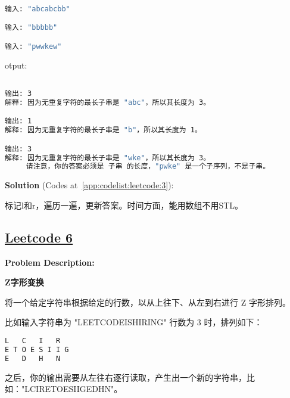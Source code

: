 \begin{lstlisting}[language=bash]

输入: "abcabcbb"

输入: "bbbbb"

输入: "pwwkew"


\end{lstlisting}

otput:\par

\begin{lstlisting}[language=bash]

输出: 3 
解释: 因为无重复字符的最长子串是 "abc"，所以其长度为 3。

输出: 1
解释: 因为无重复字符的最长子串是 "b"，所以其长度为 1。

输出: 3
解释: 因为无重复字符的最长子串是 "wke"，所以其长度为 3。
     请注意，你的答案必须是 子串 的长度，"pwke" 是一个子序列，不是子串。


\end{lstlisting}

\textbf{Solution }(Codes at~\ref{app:codelist:leetcode:3}):\par

标记l和r，遍历一遍，更新答案。时间方面，能用数组不用STL。\par



\subsection{\href{https://leetcode-cn.com/}{Leetcode 6}}\label{app:problemlist:leetcode:6}

\textbf{Problem Description:}\par

\textbf{Z字形变换}\par

将一个给定字符串根据给定的行数，以从上往下、从左到右进行 Z 字形排列。\par

比如输入字符串为 "LEETCODEISHIRING" 行数为 3 时，排列如下：\par

\begin{lstlisting}[language=bash]
L   C   I   R
E T O E S I I G
E   D   H   N
\end{lstlisting}

之后，你的输出需要从左往右逐行读取，产生出一个新的字符串，比如："LCIRETOESIIGEDHN"。\par


